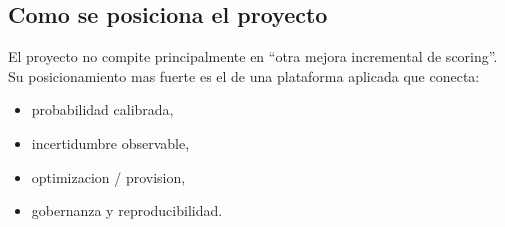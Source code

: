 \documentclass[
  spanish,
  11pt,
  letterpaper,
]{scrbook}
\providecommand{\tightlist}{%
  \setlength{\itemsep}{0pt}\setlength{\parskip}{0pt}}
\theoremstyle{plain}
\theoremstyle{remark}
\begin{document}
\subsection{Como se posiciona el
proyecto}\label{como-se-posiciona-el-proyecto}

El proyecto no compite principalmente en ``otra mejora incremental de
scoring''. Su posicionamiento mas fuerte es el de una plataforma
aplicada que conecta:

\begin{itemize}
\tightlist
\item
  probabilidad calibrada,
\item
  incertidumbre observable,
\item
  optimizacion / provision,
\item
  gobernanza y reproducibilidad.
\end{itemize}
\end{document}
